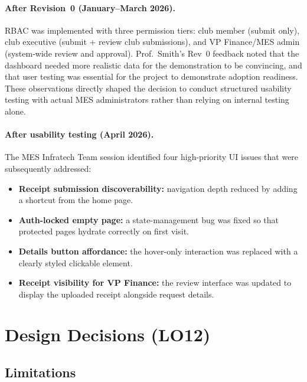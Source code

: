 \documentclass{article}
\begin{document}
\paragraph{After Revision~0 (January--March 2026).}
RBAC was implemented with three permission tiers: club member (submit
only), club executive (submit + review club submissions), and VP
Finance/MES admin (system-wide review and approval).  Prof.\ Smith's Rev~0
feedback noted that the dashboard needed more realistic data for the
demonstration to be convincing, and that user testing was essential for the
project to demonstrate adoption readiness.  These observations directly
shaped the decision to conduct structured usability testing with actual MES
administrators rather than relying on internal testing alone.

\paragraph{After usability testing (April 2026).}
The MES Infratech Team session identified four high-priority UI issues that
were subsequently addressed:
\begin{itemize}
  \item \textbf{Receipt submission discoverability:} navigation depth
    reduced by adding a shortcut from the home page.
  \item \textbf{Auth-locked empty page:} a state-management bug was fixed
    so that protected pages hydrate correctly on first visit.
  \item \textbf{Details button affordance:} the hover-only interaction was
    replaced with a clearly styled clickable element.
  \item \textbf{Receipt visibility for VP Finance:} the review interface
    was updated to display the uploaded receipt alongside request details.
\end{itemize}

\section{Design Decisions (LO12)}

\subsection{Limitations}
\end{document}

